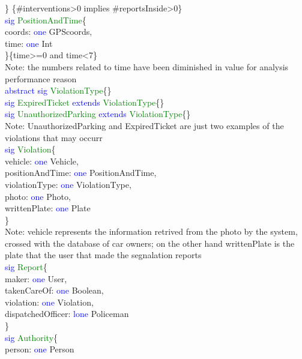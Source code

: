 \} \{\#interventions>0 implies \#reportsInside>0\}\\
\textcolor{blue}{sig}
\textcolor{green}{PositionAndTime}\{ \\
coords: \textcolor{blue}{one} GPScoords,\\
time: \textcolor{blue}{one} Int\\ 
\}\{time>=0 and time<7\} \\
Note: the numbers related to time have been diminished in value for analysis performance reason\\
\textcolor{blue}{abstract sig}
\textcolor{green}{ViolationType}\{\} \\
\textcolor{blue}{sig}
\textcolor{green}{ExpiredTicket}
\textcolor{blue}{extends}
\textcolor{green}{ViolationType}\{\} \\
\textcolor{blue}{sig}
\textcolor{green}{UnauthorizedParking}
\textcolor{blue}{extends}
\textcolor{green}{ViolationType}\{\} \\
Note: UnauthorizedParking and ExpiredTicket are just two examples of the violations that may occurr\\
\textcolor{blue}{sig}
\textcolor{green}{Violation}\{ \\
vehicle: \textcolor{blue}{one} Vehicle,\\ 
positionAndTime: \textcolor{blue}{one} PositionAndTime,\\
violationType: \textcolor{blue}{one} ViolationType,\\
photo: \textcolor{blue}{one} Photo,\\
writtenPlate: \textcolor{blue}{one} Plate\\
\}\ \\
Note: vehicle represents the information retrived from the photo by the system, crossed with the database of car owners; on the other hand writtenPlate is the plate that the user that made the segnalation reports\\
\textcolor{blue}{sig}
\textcolor{green}{Report}\{\\
maker: \textcolor{blue}{one} User,\\
takenCareOf: \textcolor{blue}{one} Boolean,\\
violation: \textcolor{blue}{one} Violation,\\
dispatchedOfficer: \textcolor{blue}{lone} Policeman\\
\}\\
\textcolor{blue}{sig}
\textcolor{green}{Authority}\{\\
person: \textcolor{blue}{one} Person\\
